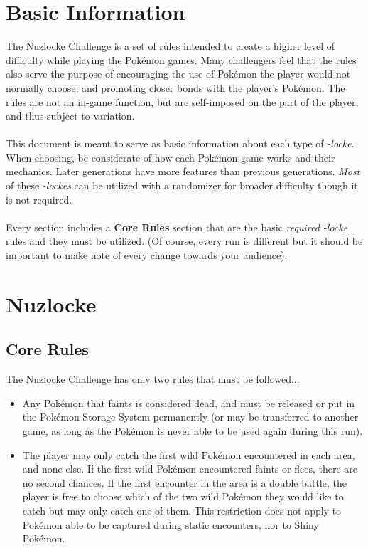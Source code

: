 \documentclass{article}
\begin{document}
\section{Basic Information}
	The Nuzlocke Challenge is a set of rules intended to create a higher level of difficulty while playing the Pokémon games. Many challengers feel that the rules also serve the purpose of encouraging the use of Pokémon the player would not normally choose, and promoting closer bonds with the player's Pokémon. The rules are not an in-game function, but are self-imposed on the part of the player, and thus subject to variation.
	\\\\
	This document is meant to serve as basic information about each type of \textit{-locke}. When choosing, be considerate of how each Pokémon game works and their mechanics. Later generations have more features than previous generations. \textit{Most} of these \textit{-lockes} can be utilized with a randomizer for broader difficulty though it is not required. 
	\\\\
	Every section includes a \textbf{Core Rules} section that are the basic \textit{required -locke} rules and they must be utilized. (Of course, every run is different but it should be important to make note of every change towards your audience).
\newpage

\section{Nuzlocke}

	\subsection{Core Rules}
		The Nuzlocke Challenge has only two rules that must be followed...

			\begin{itemize}
				\item 
					Any Pokémon that faints is considered dead, and must be released or put in the Pokémon Storage System permanently (or may be transferred to another game, as long as the Pokémon is never able to be used again during this run).
				\item
					The player may only catch the first wild Pokémon encountered in each area, and none else. If the first wild Pokémon encountered faints or flees, there are no second chances. If the first encounter in the area is a double battle, the player is free to choose which of the two wild Pokémon they would like to catch but may only catch one of them. This restriction does not apply to Pokémon able to be captured during static encounters, nor to Shiny Pokémon.
			\end{itemize}
\end{document}
